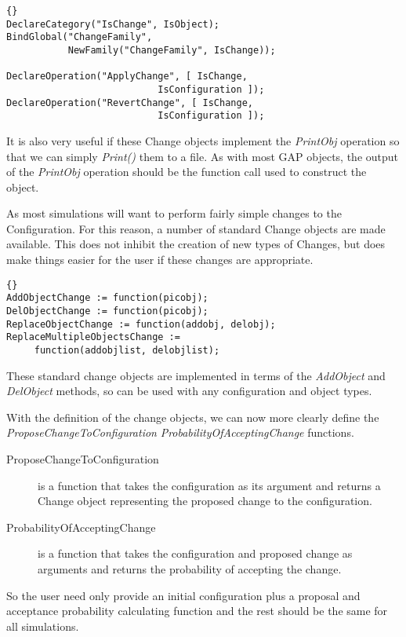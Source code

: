 \documentclass[12pt,a4paper]{book}  %
\begin{document}
\begin{lstlisting}{}
DeclareCategory("IsChange", IsObject);
BindGlobal("ChangeFamily",
           NewFamily("ChangeFamily", IsChange));

DeclareOperation("ApplyChange", [ IsChange,
                           IsConfiguration ]);
DeclareOperation("RevertChange", [ IsChange,
                           IsConfiguration ]);
\end{lstlisting}

It is also very useful if these Change objects implement the
\emph{PrintObj} operation so that we can simply \emph{Print()} them to
a file.  As with most GAP objects, the output of the \emph{PrintObj}
operation should be the function call used to construct the object.

As most simulations will want to perform fairly simple changes to the
Configuration.  For this reason, a number of standard Change objects
are made available.  This does not inhibit the creation of new types
of Changes, but does make things easier for the user if these changes
are appropriate.

\begin{lstlisting}{}
AddObjectChange := function(picobj);
DelObjectChange := function(picobj);
ReplaceObjectChange := function(addobj, delobj);
ReplaceMultipleObjectsChange :=
     function(addobjlist, delobjlist);
\end{lstlisting}

These standard change objects are implemented in terms of the
\emph{AddObject} and \emph{DelObject} methods, so can be used with any
configuration and object types.

With the definition of the change objects, we can now more clearly
define the \emph{ProposeChangeToConfiguration}
\emph{ProbabilityOfAcceptingChange} functions.

\begin{description}
\item[ProposeChangeToConfiguration] is a function that takes the
configuration as its argument and returns a Change object representing
the proposed change to the configuration.
\item[ProbabilityOfAcceptingChange] is a function that takes the
configuration and proposed change as arguments and returns the
probability of accepting the change.
\end{description}

So the user need only provide an initial configuration plus a proposal
and acceptance probability calculating function and the rest should be
the same for all simulations.
\end{document}
